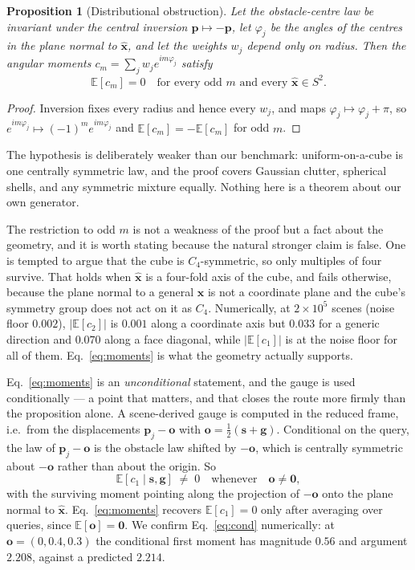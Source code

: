 \documentclass[10pt,twocolumn,letterpaper]{article}
\theoremstyle{plain}
\newtheorem{proposition}{Proposition}
\newcommand{\xhat}{\hat{\mathbf{x}}}
\newcommand{\svec}{\mathbf{s}}
\newcommand{\gvec}{\mathbf{g}}
\begin{document}
\begin{proposition}[Distributional obstruction]
\label{prop:moments}
Let the obstacle-centre law be invariant under the central inversion
$\mathbf{p}\mapsto-\mathbf{p}$, let $\varphi_j$ be the angles of the centres in
the plane normal to $\xhat$, and let the weights $w_j$ depend only on radius.
Then the angular moments $c_m=\sum_j w_j e^{im\varphi_j}$ satisfy
\begin{equation}
  \mathbb{E}[c_m] = 0 \quad\text{for every odd } m
  \text{ and every } \xhat \in S^2 .
  \label{eq:moments}
\end{equation}
\end{proposition}

\begin{proof}
Inversion fixes every radius and hence every $w_j$, and maps
$\varphi_j\mapsto\varphi_j+\pi$, so $e^{im\varphi_j}\mapsto(-1)^m e^{im\varphi_j}$
and $\mathbb{E}[c_m]=-\mathbb{E}[c_m]$ for odd $m$.
\end{proof}

The hypothesis is deliberately weaker than our benchmark: uniform-on-a-cube is
one centrally symmetric law, and the proof covers Gaussian clutter, spherical
shells, and any symmetric mixture equally. Nothing here is a theorem about our
own generator.

The restriction to odd $m$ is not a weakness of the proof but a fact about the
geometry, and it is worth stating because the natural stronger claim is false.
One is tempted to argue that the cube is $C_4$-symmetric, so only multiples of
four survive. That holds when $\xhat$ is a four-fold axis of the cube, and fails
otherwise, because the plane normal to a general $\xhat$ is not a coordinate
plane and the cube's symmetry group does not act on it as $C_4$. Numerically, at
$2\times10^5$ scenes (noise floor $0.002$), $|\mathbb{E}[c_2]|$ is $0.001$ along
a coordinate axis but $0.033$ for a generic direction and $0.070$ along a face
diagonal, while $|\mathbb{E}[c_1]|$ is at the noise floor for all of them.
Eq.~\eqref{eq:moments} is what the geometry actually supports.

Eq.~\eqref{eq:moments} is an \emph{unconditional} statement, and the gauge is
used conditionally --- a point that matters, and that closes the route more
firmly than the proposition alone. A scene-derived gauge is computed in the
reduced frame, i.e.\ from the displacements $\mathbf{p}_j-\mathbf{o}$ with
$\mathbf{o}=\tfrac12(\svec+\gvec)$. Conditional on the query, the law of
$\mathbf{p}_j-\mathbf{o}$ is the obstacle law shifted by $-\mathbf{o}$, which is
centrally symmetric about $-\mathbf{o}$ rather than about the origin. So
\begin{equation}
  \mathbb{E}[c_1 \mid \svec,\gvec] \;\neq\; 0
  \quad\text{whenever}\quad \mathbf{o}\neq\mathbf{0},
  \label{eq:cond}
\end{equation}
with the surviving moment pointing along the projection of $-\mathbf{o}$ onto
the plane normal to $\xhat$. Eq.~\eqref{eq:moments} recovers $\mathbb{E}[c_1]=0$
only after averaging over queries, since $\mathbb{E}[\mathbf{o}]=\mathbf{0}$. We
confirm Eq.~\eqref{eq:cond} numerically: at $\mathbf{o}=(0,0.4,0.3)$ the
conditional first moment has magnitude $0.56$ and argument $2.208$, against a
predicted $2.214$.
\end{document}
